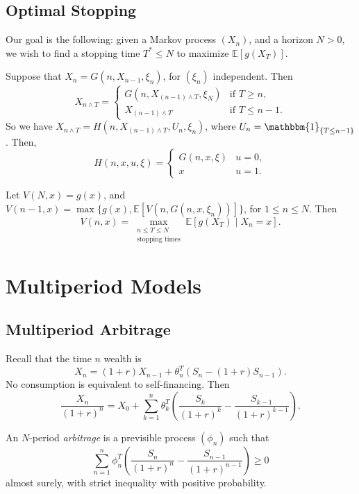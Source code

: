 \documentclass[12pt]{article}
\begin{document}

\subsection{Optimal Stopping}%
\label{sub:opt_stop}

Our goal is the following: given a Markov process $(X_n)$, and a horizon $N > 0$, we wish to find a stopping time $T^\ast \leq N$ to maximize $\mathbb{E}[g(X_T)]$.

Suppose that $X_n = G(n, X_{n-1}, \xi_n)$, for $(\xi_n)$ independent. Then
\[
X_{n \wedge T} =
\begin{cases}
	G(n, X_{(n-1) \wedge T}, \xi_N) & \text{if } T \geq n, \\
	X_{(n-1) \wedge T} & \text{if } T \leq n-1.
\end{cases}
\]
So we have $X_{n \wedge T} = H(n, X_{(n-1) \wedge T}, U_n, \xi_n)$, where $U_n = \mathbbm{1}_{\{T \leq n-1\}}$. Then,
\[
H(n, x, u, \xi) =
\begin{cases}
	G(n, x, \xi) & u = 0, \\
	x & u = 1.
\end{cases}
\]
\begin{theorem}
	Let $V(N, x) = g(x)$, and $V(n-1, x) = \max \{ g(x), \mathbb{E}[V(n, G(n, x, \xi_n))]\}$, for $1 \leq n \leq N$. Then
	\[
		V(n, x) = \max_{\substack{n \leq T \leq N \\ \text{stopping times}}} \mathbb{E}[g(X_T) \mid X_n = x].
	\]
\end{theorem}

\newpage

\section{Multiperiod Models}%
\label{sec:mult_mod}


\subsection{Multiperiod Arbitrage}%
\label{sub:mult_arb}


Recall that the time $n$ wealth is
\[
X_n = (1+r) X_{n-1} + \theta_n^T (S_n - (1+r) S_{n-1}).
\]
No consumption is equivalent to self-financing. Then
\[
\frac{X_n}{(1+r)^n} = X_0 + \sum_{k = 1}^n \theta_k^T \left( \frac{S_k}{(1+r)^k} - \frac{S_{k-1}}{(1+r)^{k-1}}\right).
\]

\begin{definition}
	An $N$-period \emph{arbitrage} is a previsible process $(\phi_n)$ such that
	\[
	\sum_{n = 1}^n \phi_n^T \left( \frac{S_n}{(1+r)^n} - \frac{S_{n-1}}{(1+r)^{n-1}} \right) \geq 0
	\]
	almost surely, with strict inequality with positive probability.
\end{definition}
\end{document}

